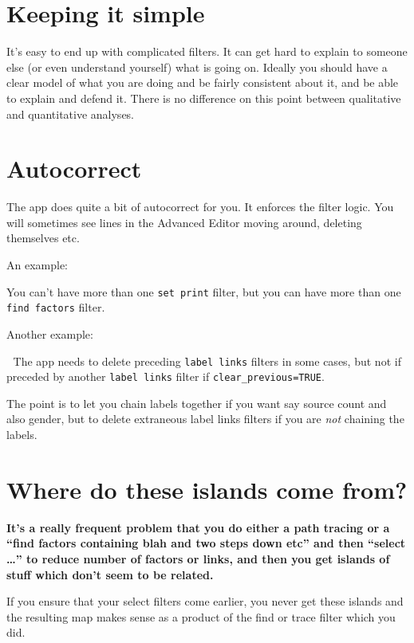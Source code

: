 \documentclass[
]{book}
\begin{document}
\hypertarget{keeping-it-simple}{%
\section{Keeping it simple}\label{keeping-it-simple}}

It's easy to end up with complicated filters. It can get hard to explain to someone else (or even understand yourself) what is going on. Ideally you should have a clear model of what you are doing and be fairly consistent about it, and be able to explain and defend it. There is no difference on this point between qualitative and quantitative analyses.

\hypertarget{xautocorrect}{%
\section{Autocorrect}\label{xautocorrect}}

The app does quite a bit of autocorrect for you. It enforces the filter logic. You will sometimes see lines in the Advanced Editor moving around, deleting themselves etc.

An example:

You can't have more than one \texttt{set\ print} filter, but you can have more than one \texttt{find\ factors} filter.

Another example:

🧪 The app needs to delete preceding \texttt{label\ links} filters in some cases, but not if preceded by another \texttt{label\ links} filter if \texttt{clear\_previous=TRUE}.

The point is to let you chain labels together if you want say source count and also gender, but to delete extraneous label links filters if you are \emph{not} chaining the labels.

\hypertarget{where-do-these-islands-come-from}{%
\section{Where do these islands come from?}\label{where-do-these-islands-come-from}}

\textbf{It's a really frequent problem that you do either a path tracing or a ``find factors containing blah and two steps down etc'' and then ``select \ldots{}'' to reduce number of factors or links, and then you get islands of stuff which don't seem to be related.}

If you ensure that your select filters come earlier, you never get these islands and the resulting map makes sense as a product of the find or trace filter which you did.
\end{document}
